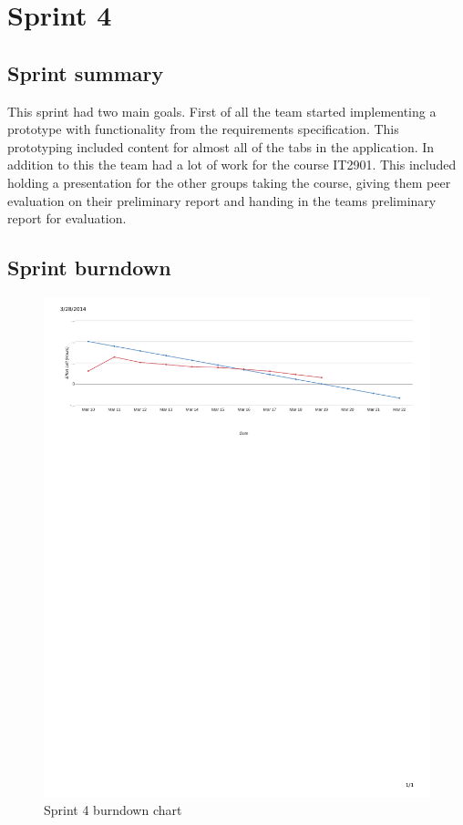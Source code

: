 \section{Sprint 4}
\subsection{Sprint summary}
This sprint had two main goals. First of all the team started implementing a prototype with functionality from the requirements specification. This prototyping included content for almost all of the tabs in the application. In addition to this the team had a lot of work for the course IT2901. This included holding a presentation for the other groups taking the course, giving them peer evaluation on their preliminary report and handing in the teams preliminary report for evaluation.

\subsection{Sprint burndown}

\begin{figure}[H]
\includegraphics[width=\textwidth, trim= 1cm 21cm 1cm 1cm, clip=true]{ch/projectManagement/fig/burndown4.pdf}
\caption{Sprint 4 burndown chart}
\label{fig:sprint4burndown}
\end{figure}


